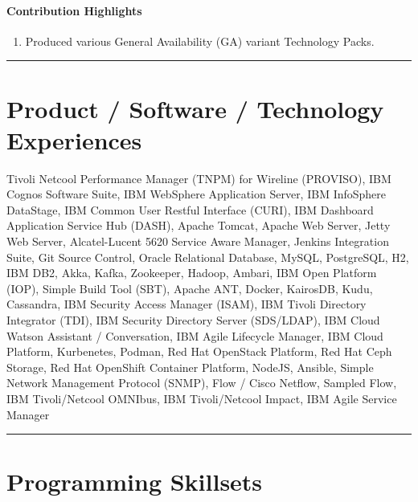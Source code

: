 \documentclass[
]{article}
\providecommand{\tightlist}{%
  \setlength{\itemsep}{0pt}\setlength{\parskip}{0pt}}
\begin{document}
\hypertarget{contribution-highlights-13}{%
\paragraph{Contribution Highlights}\label{contribution-highlights-13}}

\begin{enumerate}
\def\labelenumi{\arabic{enumi}.}
\tightlist
\item
  Produced various General Availability (GA) variant Technology Packs.
\end{enumerate}

\begin{center}\rule{0.5\linewidth}{0.5pt}\end{center}

\hypertarget{product-software-technology-experiences}{%
\section{Product / Software / Technology
Experiences}\label{product-software-technology-experiences}}

Tivoli Netcool Performance Manager (TNPM) for Wireline (PROVISO), IBM
Cognos Software Suite, IBM WebSphere Application Server, IBM InfoSphere
DataStage, IBM Common User Restful Interface (CURI), IBM Dashboard
Application Service Hub (DASH), Apache Tomcat, Apache Web Server, Jetty
Web Server, Alcatel-Lucent 5620 Service Aware Manager, Jenkins
Integration Suite, Git Source Control, Oracle Relational Database,
MySQL, PostgreSQL, H2, IBM DB2, Akka, Kafka, Zookeeper, Hadoop, Ambari,
IBM Open Platform (IOP), Simple Build Tool (SBT), Apache ANT, Docker,
KairosDB, Kudu, Cassandra, IBM Security Access Manager (ISAM), IBM
Tivoli Directory Integrator (TDI), IBM Security Directory Server
(SDS/LDAP), IBM Cloud Watson Assistant / Conversation, IBM Agile
Lifecycle Manager, IBM Cloud Platform, Kurbenetes, Podman, Red Hat
OpenStack Platform, Red Hat Ceph Storage, Red Hat OpenShift Container
Platform, NodeJS, Ansible, Simple Network Management Protocol (SNMP),
Flow / Cisco Netflow, Sampled Flow, IBM Tivoli/Netcool OMNIbus, IBM
Tivoli/Netcool Impact, IBM Agile Service Manager

\begin{center}\rule{0.5\linewidth}{0.5pt}\end{center}

\hypertarget{programming-skillsets}{%
\section{Programming Skillsets}\label{programming-skillsets}}
\end{document}
